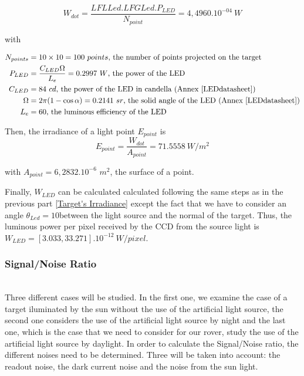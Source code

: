 \begin{equation}
\label{eq:powerpoint}
W_{dot} = \frac{LFLLed.LFGLed.P_{LED}}{N_{point}} = 4,4960.10^{-04}\ W
\end{equation}

with

\begin{align*}
N_{points} & = 10\times 10 = 100\ points\mbox{, the number of points projected on the  target}\\
P_{LED} & = \frac{C_{LED}\Omega}{L_e} = 0.2997\ W\mbox{, the power of the LED}\\
C_{LED} & = 84\ cd\mbox{, the power of the LED in candella (Annex \ref{LEDdatasheet})}\\
\Omega & = 2\pi (1-\cos \alpha) = 0.2141\ sr\mbox{, the solid angle of the LED (Annex \ref{LEDdatasheet})}\\
L_e & = 60\mbox{, the luminous efficiency of the LED}
\end{align*}

Then, the irradiance of a light point $E_{point}$ is
\begin{equation}
E_{point} = \frac{W_{dot}}{A_{point}} = 71.5558\ W/m^2
\end{equation}

with $A_{point} = 6,2832.10^{-6}$ $m^2$, the surface of a point.

Finally, $W_{LED}$ can be calculated calculated following the same steps as in the previous part \ref{Target's Irradiance} except the fact that we have to consider an angle $\theta_{Led} = 10$\textdegree between the light source and the normal of the target. Thus, the luminous power per pixel received by the CCD from the source light is $W_{LED} = [3.033, 33.271].10^{-12}\ W/pixel$.






\subsubsection{Signal/Noise Ratio}
~\\
Three different cases will be studied. In the first one, we examine the case of a target iluminated by the sun without the use of the artificial light source, the second one considers the use of the artificial light source by night and the last one, which is the case that we need to consider for our rover, study the use of the artificial light source by daylight.
In order to calculate the Signal/Noise ratio, the different noises need to be determined. Three will be taken into account: the readout noise, the dark current noise and the noise from the sun light. 


